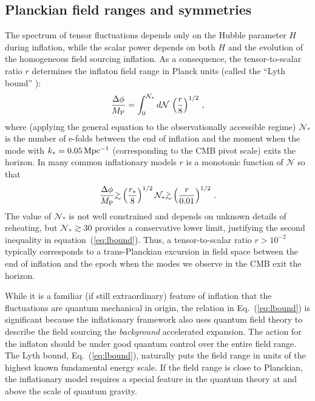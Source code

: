 \subsection{Planckian field ranges and symmetries}
The spectrum of tensor fluctuations depends only on the Hubble parameter $H$ during inflation, while the scalar power depends on both $H$ and the evolution of the homogeneous field sourcing inflation. As a consequence, the tensor-to-scalar ratio $r$ determines the inflaton field range in Planck units (called the ``Lyth bound'' \cite{Lyth:1996im}):
\begin{equation}
\label{eq:Lyth}
\frac{\Delta\phi}{M_{\rm P}}=\int_0^{\mathcal{N}_\ast}d\mathcal{N}\,\left(\frac{r}{8}\right)^{1/2}\,,
\end{equation}
where (applying the general equation to the observationally accessible regime) $\mathcal{N}_\ast$ is the number of e-folds between the end of inflation and the moment when the mode with $k_\ast=0.05\,{\rm Mpc^{-1}}$ (corresponding to the CMB pivot scale) exits the horizon. In many common inflationary models $r$ is a monotonic function of $\mathcal{N}$ so that
\begin{equation}
\label{eq:lbound}
\frac{\Delta\phi}{M_{\rm P}}\gtrsim \left(\frac{r_\ast}{8}\right)^{1/2}\mathcal{N}_\ast\gtrsim \left(\frac{r}{0.01}\right)^{1/2}\,.
\end{equation}  
The value of $\mathcal{N}_\ast$ is not well constrained and depends on unknown details of reheating, but $\mathcal{N}_\ast\gtrsim 30$ provides a conservative lower limit, justifying the second inequality in equation~(\ref{eq:lbound}). Thus, a tensor-to-scalar ratio $r>10^{-2}$ typically corresponds to a trans-Planckian excursion in field space between the end of inflation and the epoch when the modes we observe in the CMB exit the horizon.

While it is a familiar (if still extraordinary) feature of inflation that the fluctuations are quantum mechanical in origin, the relation in Eq.~(\ref{eq:lbound}) is significant because the inflationary framework also uses quantum field theory to describe the field sourcing the {\it background\/} accelerated expansion. The action for the inflaton should be under good quantum control over the entire field range. The Lyth bound, Eq.~(\ref{eq:lbound}), naturally puts the field range in units of the highest known fundamental energy scale. If the field range is close to Planckian, the inflationary model requires a special feature in the quantum theory at and above the scale of quantum gravity.

